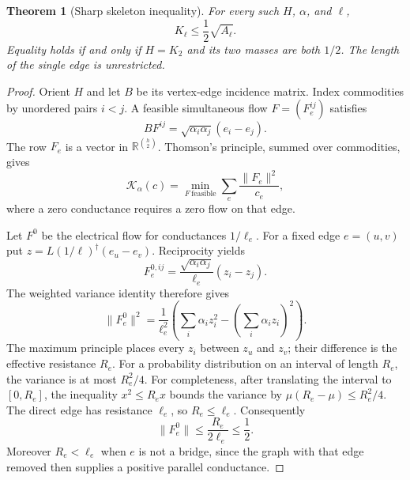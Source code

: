 \documentclass[11pt,a4paper]{article}
\newtheorem{theorem}{Theorem}[section]
\theoremstyle{definition}
\theoremstyle{remark}
\numberwithin{equation}{section}
\begin{document}
\begin{theorem}[Sharp skeleton inequality]\label{p5:thm:skel-flow}
For every such $H$, $\alpha$, and $\ell$,
\begin{equation}\label{p5:eq:skel-flow-sharp}
 K_\ell\leq\frac12\sqrt{A_\ell}.
\end{equation}
Equality holds if and only if $H=K_2$ and its two masses are both
$1/2$.  The length of the single edge is unrestricted.
\end{theorem}

\begin{proof}
Orient $H$ and let $B$ be its vertex-edge incidence matrix.  Index
commodities by unordered pairs $i<j$.  A feasible simultaneous flow
$F=(F_e^{ij})$ satisfies
\[
 B F^{ij}=\sqrt{\alpha_i\alpha_j}(e_i-e_j).
\]
The row $F_e$ is a vector in $\mathbb R^{\binom h2}$.
Thomson's principle, summed over commodities, gives
\begin{equation}\label{p5:eq:skel-Thomson}
 \mathcal K_\alpha(c)
 =\min_{F\ \mathrm{feasible}}\sum_e\frac{\|F_e\|^2}{c_e},
\end{equation}
where a zero conductance requires a zero flow on that edge.

Let $F^0$ be the electrical flow for conductances $1/\ell_e$.
For a fixed edge $e=(u,v)$ put
$z=L(1/\ell)^\dagger(e_u-e_v)$.  Reciprocity yields
\[
 F_e^{0,ij}=\frac{\sqrt{\alpha_i\alpha_j}}{\ell_e}(z_i-z_j).
\]
The weighted variance identity therefore gives
\begin{equation}\label{p5:eq:skel-row-variance}
 \|F_e^0\|^2=\frac1{\ell_e^2}
  \left(\sum_i\alpha_i z_i^2-
                \left(\sum_i\alpha_i z_i\right)^2\right).
\end{equation}
The maximum principle places every $z_i$ between $z_u$ and $z_v$;
their difference is the effective resistance $R_e$.
For a probability distribution on an interval of length $R_e$, the
variance is at most $R_e^2/4$.  For completeness, after translating
the interval to $[0,R_e]$, the inequality $x^2\leq R_e x$ bounds
the variance by $\mu(R_e-\mu)\leq R_e^2/4$.
The direct edge has resistance $\ell_e$, so $R_e\leq\ell_e$.
Consequently
\begin{equation}\label{p5:eq:skel-row-bound}
 \|F_e^0\|\leq\frac{R_e}{2\ell_e}\leq\frac12.
\end{equation}
Moreover $R_e<\ell_e$ when $e$ is not a bridge, since the graph
with that edge removed then supplies a positive parallel conductance.


\end{proof}
\end{document}

